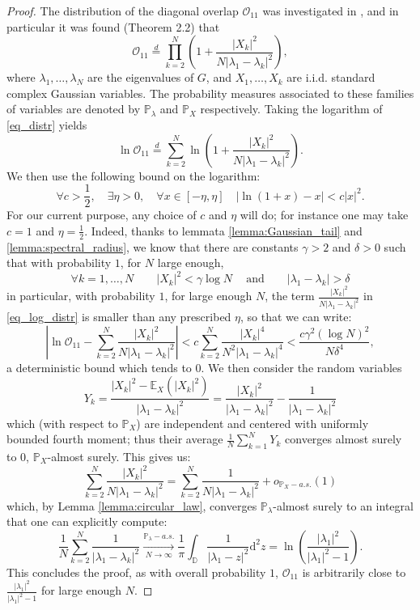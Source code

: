 \documentclass[12pt,a4paper]{amsart}
\theoremstyle{plain} %
\newcommand{\E}{\mathbb{E}}
\newcommand{\PP}{\mathbb{P}}
\newcommand{\DD}{\mathbb{D}}
\renewcommand{\dd}{\mathrm{d}}
\newcommand{\Ov}{\mathscr{O}}
\newcommand{\la}{\lambda}
\begin{document}
\begin{proof}
The distribution of the diagonal overlap $\mathscr{O}_{11}$ was investigated in \cite{BourgadeDubach}, and in particular it was found (Theorem 2.2) that
\begin{equation}\label{eq_distr}
\Ov_{11} \stackrel{d}{=} \prod_{k=2}^N \left( 1 + \frac{|X_k|^2}{N |\la_1 - \la_k|^2} \right),
\end{equation}
where $\la_1, \dots, \la_N$ are the eigenvalues of $G$, and $X_1, \dots, X_k$ are i.i.d. standard complex Gaussian variables. The probability measures associated to these families of variables are denoted by $\PP_{\la}$ and $\PP_{X}$ respectively. 
Taking the logarithm of \eqref{eq_distr} yields
\begin{equation}\label{eq_log_distr}
\ln \Ov_{11} \stackrel{d}{=} \sum_{k=2}^N \ln \left( 1 + \frac{|X_k|^2}{N |\la_1 - \la_k|^2} \right).
\end{equation}
We then use the following bound on the logarithm:
$$
\forall c > \frac12, \quad 
\exists \eta >0 , \quad 
\forall x \in [- \eta, \eta] \quad 
\left| \ln \left( 1 + x \right) - x \right| < c |x|^2.
$$
For our current purpose, any choice of $c$ and $\eta$ will do; for instance one may take $c = 1$ and $\eta = \frac12$. Indeed, thanks to lemmata \ref{lemma:Gaussian_tail} and \ref{lemma:spectral_radius}, we know that there are constants $\gamma > 2$ and $\delta >0$ such that with probability $1$, for $N$ large enough,
$$
\forall k = 1, \dots, N \qquad
|X_k|^2 < \gamma \log N \
\quad \text{and} \quad
\quad |\la_1 - \la_k| > \delta
$$
in particular, with probability $1$, for large enough $N$, the term $\frac{|X_k|^2}{N |\la_1 - \la_k|^2}$ in \eqref{eq_log_distr} is smaller than any prescribed $\eta$, so that we can write:
$$
\left| \ln \Ov_{11} - \sum_{k=2}^N \frac{|X_k|^2}{N |\la_1 - \la_k|^2} \right| < c \sum_{k=2}^N \frac{|X_k|^4}{N^2 |\la_1 - \la_k|^4} < \frac{c \gamma^2 (\log N)^2}{ N \delta^{4} },
$$
a deterministic bound which tends to $0$.
We then consider the random variables
$$
Y_k = \frac{|X_k|^2 - \E_X (|X_k|^2) }{|\la_1 - \la_k|^2}
= \frac{|X_k|^2}{|\la_1 - \la_k|^2} - \frac{1}{|\la_1 - \la_k|^2}
$$
which (with respect to $\PP_X$) are independent and centered with uniformly bounded fourth moment; thus their average $\frac1N \sum_{k=1}^N Y_k$ converges almost surely to $0$, $\PP_X$-almost surely. This gives us:
$$
\sum_{k=2}^N \frac{|X_k|^2}{N |\la_1 - \la_k|^2} 
= \sum_{k=2}^{N} \frac{1}{N |\la_1 - \la_k|^2}
+ o_{\PP_X-a.s.}(1)
$$
which, by Lemma \ref{lemma:circular_law}, converges $\PP_{\lambda}$-almost surely to an integral that one can explicitly compute:
$$
\frac{1}{N} \sum_{k=2}^{N} \frac{1}{|\la_1 - \la_k|^2} \xrightarrow[N \rightarrow \infty]{\PP_{\la}-a.s.}
\frac{1}{\pi} \int_{\DD} \frac{1}{|\la_1 - z|^2} \dd^2 z = \ln \left( \frac{|\la_1|^2}{|\la_1|^2 - 1} \right).
$$
This concludes the proof, as with overall probability $1$, $\Ov_{11}$ is arbitrarily close to $\frac{|\la_1|^2}{|\la_1|^2 - 1}$ for large enough $N$.
\end{proof}
\end{document}
